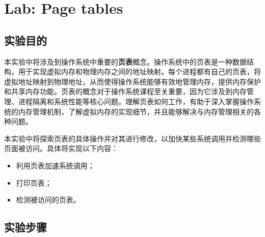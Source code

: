 \section{Lab: Page tables}
\subsection{实验目的}

本实验中将涉及到操作系统中重要的\textbf{页表}概念。操作系统中的页表是一种数据结构，用于实现虚拟内存和物理内存之间的地址映射。每个进程都有自己的页表，将虚拟地址映射到物理地址，从而使得操作系统能够有效地管理内存，提供内存保护和共享内存功能。页表的概念对于操作系统课程至关重要，因为它涉及到内存管理、进程隔离和系统性能等核心问题。理解页表如何工作，有助于深入掌握操作系统的内存管理机制，了解虚拟内存的实现细节，并且能够解决与内存管理相关的各种问题。

本实验中将探索页表的具体操作并对其进行修改，以加快某些系统调用并检测哪些页面被访问。具体将实现以下内容：
\begin{itemize}
    \item 利用页表加速系统调用；
    \item 打印页表；
    \item 检测被访问的页表。
\end{itemize}

\subsection{实验步骤}

